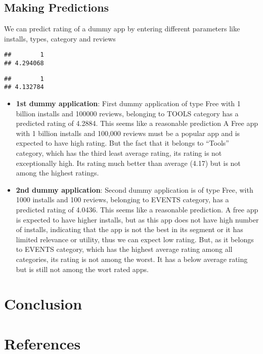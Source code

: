 \documentclass[
]{article}
\providecommand{\tightlist}{%
  \setlength{\itemsep}{0pt}\setlength{\parskip}{0pt}}
\begin{document}
\hypertarget{making-predictions}{%
\subsection{Making Predictions}\label{making-predictions}}

We can predict rating of a dummy app by entering different parameters
like installs, types, category and reviews

\begin{verbatim}
##        1 
## 4.294068
\end{verbatim}

\begin{verbatim}
##        1 
## 4.132784
\end{verbatim}

\begin{itemize}
\tightlist
\item
  \textbf{1st dummy application}: First dummy application of type Free
  with 1 billion installs and 100000 reviews, belonging to TOOLS
  category has a predicted rating of 4.2884. This seems like a
  reasonable prediction A Free app with 1 billion installs and 100,000
  reviews must be a popular app and is expected to have high rating. But
  the fact that it belongs to ``Tools'' category, which has the third
  least average rating, its rating is not exceptionally high. Its rating
  much better than average (4.17) but is not among the highest ratings.
\item
  \textbf{2nd dummy application}: Second dummy application is of type
  Free, with 1000 installs and 100 reviews, belonging to EVENTS
  category, has a predicted rating of 4.0436. This seems like a
  reasonable prediction. A free app is expected to have higher installs,
  but as this app does not have high number of installs, indicating that
  the app is not the best in its segment or it has limited relevance or
  utility, thus we can expect low rating. But, as it belongs to EVENTS
  category, which has the highest average rating among all categories,
  its rating is not among the worst. It has a below average rating but
  is still not among the wort rated apps.
\end{itemize}

\hypertarget{conclusion-1}{%
\section{Conclusion}\label{conclusion-1}}

\hypertarget{references}{%
\section{References}\label{references}}
\end{document}
